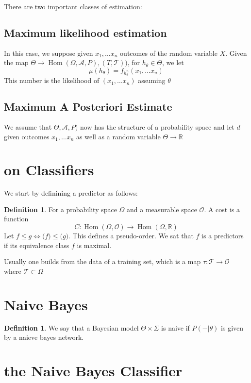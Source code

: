 \documentclass{book}
\theoremstyle{plain}
\theoremstyle{definition}
\newtheorem{definition}[corollary]{Definition}
\renewcommand{\d}[1]{\mathbb{#1}}
\DeclareMathOperator{\Hom}{Hom}
\newcommand{\mor}{\longrightarrow}
\renewcommand{\r}[1]{\mathcal{#1}}
\renewcommand{\c}[1]{\mathcal{#1}}
\begin{document}
There are two important classes of estimation:

\subsection{Maximum likelihood estimation}
 In this case, we suppose given $x_1,\dots x_n$ outcomes of the random variable $X$. Given the map $\Theta \mor \Hom(\Omega,\r{A},P), (T,\r{T}))$, for $h_\theta \in \Theta$, we let \[\mu(h_\theta)=f_{h_\theta^n}(x_1,\ldots x_n)\]
 This number is the likelihood of $(x_1,\ldots x_n)$ assuming $\theta$
 
 \subsection{Maximum A Posteriori Estimate}
 We assume that $\Theta,\r{A},P)$ now has the structure of a probability space and let $ d$ given outcomes $x_1,\ldots x_n$ as well as a random variable $\Theta\mor \d{R}$
\section{on Classifiers}

We start by definining a predictor as follows:
\begin{definition}
For a probability space $\Omega$ and a measurable space $\r{O}$. A cost is a function
\[
C:\Hom(\Omega,\r{O}) \mor \Hom(\Omega,\d{R})
\]	
Let $f\le g \iff \c(f)\le \c(g)$. This defines a pseudo-order. We sat that $f$ is a predictors if its equivalence class $\bar{f}$ is maximal.
\end{definition}

Usually one builds from the data of a training set, which is a map $\tau: \r{T}\mor \r{O}$ where $\r{T}\subset \Omega$

\section{Naive Bayes}

\begin{definition}
We say that a Bayesian model $\Theta \times \Sigma$ 	is naive if $P(-\vert \theta)$ is given by a naieve bayes network.
\end{definition}


\section{the Naive Bayes Classifier}
\end{document}
